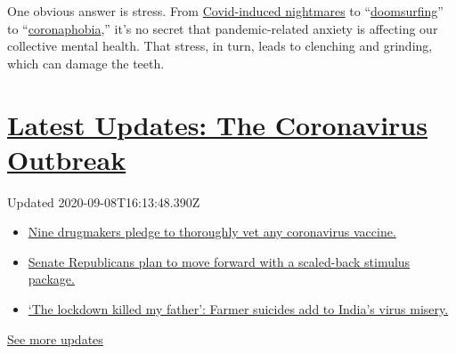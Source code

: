 One obvious answer is stress. From
\href{https://www.nytimes3xbfgragh.onion/2020/04/13/style/why-weird-dreams-coronavirus.html}{Covid-induced
nightmares} to
``\href{https://www.nytimes3xbfgragh.onion/2020/03/20/technology/coronavirus-doomsurfing.html}{doomsurfing}''
to
``\href{https://www.wellandgood.com/coronavirus-anxiety-scale-coronaphobia/}{coronaphobia},''
it's no secret that pandemic-related anxiety is affecting our collective
mental health. That stress, in turn, leads to clenching and grinding,
which can damage the teeth.

\hypertarget{latest-updates-the-coronavirus-outbreak}{%
\section{\texorpdfstring{\href{https://www.nytimes3xbfgragh.onion/2020/09/08/world/covid-19-coronavirus.html?action=click\&pgtype=Article\&state=default\&region=MAIN_CONTENT_1\&context=storylines_live_updates}{Latest
Updates: The Coronavirus
Outbreak}}{Latest Updates: The Coronavirus Outbreak}}\label{latest-updates-the-coronavirus-outbreak}}

Updated 2020-09-08T16:13:48.390Z

\begin{itemize}
\tightlist
\item
  \href{https://www.nytimes3xbfgragh.onion/2020/09/08/world/covid-19-coronavirus.html?action=click\&pgtype=Article\&state=default\&region=MAIN_CONTENT_1\&context=storylines_live_updates\#link-679303d7}{Nine
  drugmakers pledge to thoroughly vet any coronavirus vaccine.}
\item
  \href{https://www.nytimes3xbfgragh.onion/2020/09/08/world/covid-19-coronavirus.html?action=click\&pgtype=Article\&state=default\&region=MAIN_CONTENT_1\&context=storylines_live_updates\#link-547feae1}{Senate
  Republicans plan to move forward with a scaled-back stimulus package.}
\item
  \href{https://www.nytimes3xbfgragh.onion/2020/09/08/world/covid-19-coronavirus.html?action=click\&pgtype=Article\&state=default\&region=MAIN_CONTENT_1\&context=storylines_live_updates\#link-1c973131}{`The
  lockdown killed my father': Farmer suicides add to India's virus
  misery.}
\end{itemize}

\href{https://www.nytimes3xbfgragh.onion/2020/09/08/world/covid-19-coronavirus.html?action=click\&pgtype=Article\&state=default\&region=MAIN_CONTENT_1\&context=storylines_live_updates}{See
more updates}


